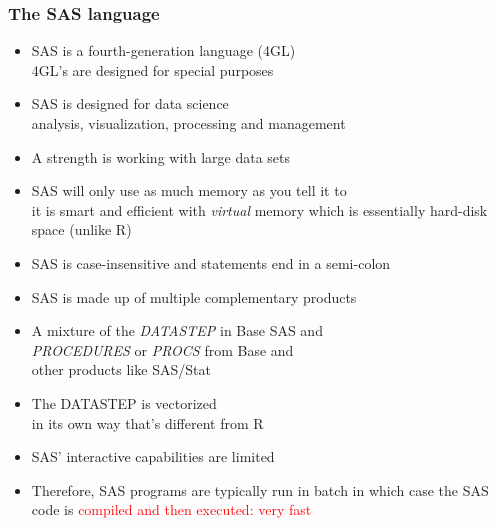 \documentclass[11pt,pdftex,dvipsnames,usenames,helvetica]{beamer}
\begin{document}
\begin{frame}[fragile]
\frametitle{The SAS language}
\begin{itemize}
\item SAS is a fourth-generation language (4GL)\\
4GL's are designed for special purposes
\item SAS is designed for data science\\
analysis, visualization, processing and management
\item A strength is working with large data sets
\item SAS will only use as much memory as you tell it to\\
it is smart and efficient with {\it virtual} memory which
is essentially hard-disk space (unlike R)
\item SAS is case-insensitive and statements end in a semi-colon
\item SAS is made up of multiple complementary products
\item A mixture of the {\it DATASTEP} in Base SAS and\\
{\it PROCEDURES} or {\it PROCS} from Base and \\
other products like SAS/Stat
\item The DATASTEP is vectorized\\
in its own way that's different from R
\item SAS' interactive capabilities are limited
\item Therefore, SAS programs are typically run in batch
in which case the SAS code is 
\textcolor{red}{compiled and then executed: very fast}
\end{itemize}
\end{frame}
\end{document}
